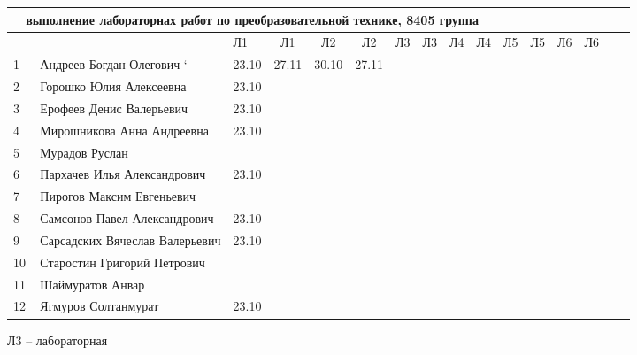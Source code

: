 \newpage
%
\begin{tabular}{l|llccccccccccccc}
\multicolumn{10}{c}{выполнение лабораторнах работ по преобразовательной технике, 8405 группа} \\
\toprule
&&Л1&Л1& Л2&Л2& Л3&Л3& Л4&Л4 &Л5&Л5& Л6&Л6\\
\midrule
1\,& Андреев Богдан Олегович        `&23.10&27.11&30.10&27.11&\\        
2\,& Горошко Юлия Алексеевна        &23.10& \\
3\,& Ерофеев Денис Валерьевич       &23.10&\\
4\,& Мирошникова Анна Андреевна     &23.10& \\
\midrule                              
5\,& Мурадов Руслан                 \\ 
6\,& Пархачев Илья Александрович    &23.10&\\ 
7\,& Пирогов Максим Евгеньевич      \\ 
8\,& Самсонов Павел Александрович   &23.10&\\ 
\midrule                              
9\,& Сарсадских Вячеслав Валерьевич &23.10&\\ 
10\,& Старостин Григорий Петрович   \\
11\,& Шаймуратов Анвар              \\
12\,& Ягмуров Солтанмурат           &23.10&\\
\bottomrule
\end{tabular}

Л3 -- лабораторная

